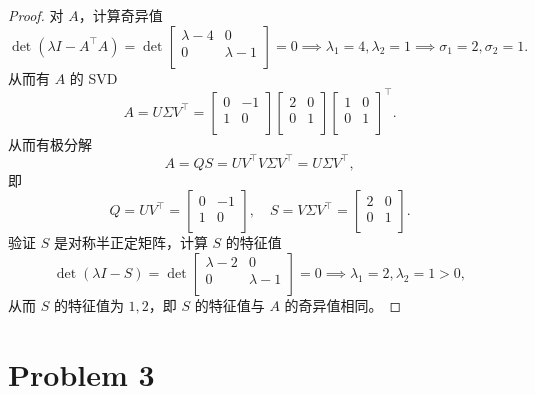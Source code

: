 \begin{proof}
    对 $A$，计算奇异值
    \[
        \det \left(\lambda I - A^\top A\right) = \det\begin{bmatrix}
            \lambda - 4 & 0 \\
            0 & \lambda - 1 \\
        \end{bmatrix} = 0 \implies \lambda_1 = 4, \lambda_2 = 1 \implies \sigma_1 = 2, \sigma_2 = 1.
    \]
    从而有 $A$ 的 SVD
    \[
        A = U \Sigma V^\top = \begin{bmatrix}
            0 & -1 \\
            1 & 0 \\
        \end{bmatrix} \begin{bmatrix}
            2 & 0 \\
            0 & 1 \\
        \end{bmatrix} \begin{bmatrix}
            1 & 0 \\
            0 & 1 \\
        \end{bmatrix}^\top.
    \]
    从而有极分解
    \[
        A = QS = UV^\top V\Sigma V^\top = U\Sigma V^\top,
    \]
    即
    \[
        Q = UV^\top = \begin{bmatrix}
            0 & -1 \\
            1 & 0 \\
        \end{bmatrix}, \quad S = V\Sigma V^\top = \begin{bmatrix}
            2 & 0 \\
            0 & 1 \\
        \end{bmatrix}.
    \]
    验证 $S$ 是对称半正定矩阵，计算 $S$ 的特征值
    \[
        \det \left(\lambda I - S\right) = \det\begin{bmatrix}
            \lambda - 2 & 0 \\
            0 & \lambda - 1 \\
        \end{bmatrix} = 0 \implies \lambda_1 = 2, \lambda_2 = 1 > 0,
    \]
    从而 $S$ 的特征值为 $1, 2$，即 $S$ 的特征值与 $A$ 的奇异值相同。
\end{proof}

\section*{Problem 3}


